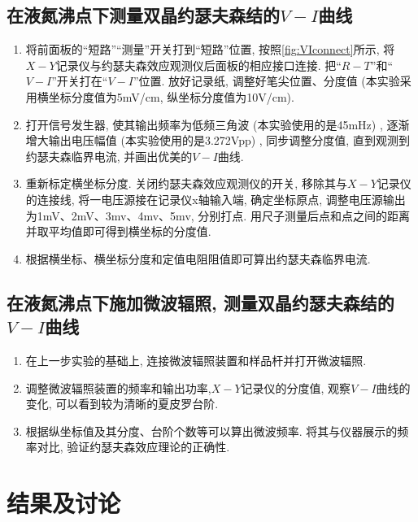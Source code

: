 \documentclass[font=default]{mpltx}
\begin{document}
  \subsection{在液氮沸点下测量双晶约瑟夫森结的$V-I$曲线}
  \begin{enumerate}
    \item 将前面板的“短路”“测量”开关打到“短路”位置, 按照\autoref{fig:VIconnect}所示, 将$X-Y$记录仪与约瑟夫森效应观测仪后面板的相应接口连接. 把“$R-T$”和“$V-I$”开关打在“$V-I$”位置. 放好记录纸, 调整好笔尖位置、分度值 (本实验采用横坐标分度值为5mV/cm, 纵坐标分度值为10\mu V/cm). 
    \item 打开信号发生器, 使其输出频率为低频三角波 (本实验使用的是45mHz) , 逐渐增大输出电压幅值 (本实验使用的是3.272Vpp) , 同步调整分度值, 直到观测到约瑟夫森临界电流, 并画出优美的$V-I$曲线.
    \item 重新标定横坐标分度. 关闭约瑟夫森效应观测仪的开关, 移除其与$X-Y$记录仪的连接线, 将一电压源接在记录仪x轴输入端, 确定坐标原点, 调整电压源输出为1mV、2mV、3mv、4mv、5mv, 分别打点. 用尺子测量后点和点之间的距离并取平均值即可得到横坐标的分度值.
    \item 根据横坐标、横坐标分度和定值电阻阻值即可算出约瑟夫森临界电流.
    
  \end{enumerate}



  \subsection{在液氮沸点下施加微波辐照, 测量双晶约瑟夫森结的$V-I$曲线}
  \begin{enumerate}
    \item 在上一步实验的基础上, 连接微波辐照装置和样品杆并打开微波辐照.
    \item 调整微波辐照装置的频率和输出功率,$X-Y$记录仪的分度值, 观察$V-I$曲线的变化, 可以看到较为清晰的夏皮罗台阶.
    \item 根据纵坐标值及其分度、台阶个数等可以算出微波频率. 将其与仪器展示的频率对比, 验证约瑟夫森效应理论的正确性.
  \end{enumerate}


\section{结果及讨论}
\end{document}
